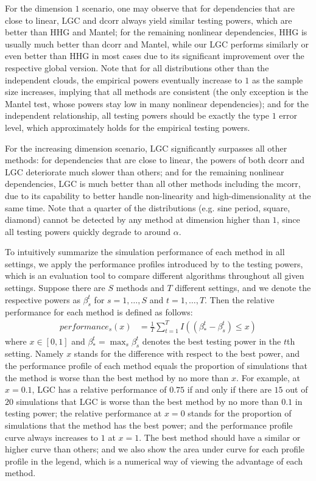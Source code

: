 \documentclass[11pt]{article}
\begin{document}
For the dimension $1$ scenario, one may observe that for dependencies that are close to linear, LGC and dcorr always yield similar testing powers, which are better than HHG and Mantel; for the remaining nonlinear dependencies, HHG is usually much better than dcorr and Mantel, while our LGC performs similarly or even better than HHG in most cases due to its significant improvement over the respective global version. Note that for all distributions other than the independent clouds, the empirical powers eventually increase to $1$ as the sample size increases, implying that all methods are consistent (the only exception is the Mantel test, whose powers stay low in many nonlinear dependencies); and for the independent relationship, all testing powers should be exactly the type $1$ error level, which approximately holds for the empirical testing powers. 

For the increasing dimension scenario, LGC significantly surpasses all other methods: for dependencies that are close to linear, the powers of both dcorr and LGC deteriorate much slower than others; and for the remaining nonlinear dependencies, LGC is much better than all other methods including the mcorr, due to its capability to better handle non-linearity and high-dimensionality at the same time. Note that a quarter of the distributions (e.g. sine period, square, diamond) cannot be detected by any method at dimension higher than $1$, since all testing powers quickly degrade to around $\alpha$.

To intuitively summarize the simulation performance of each method in all settings, we apply the performance profiles introduced by \cite{DolanMore2002} to the testing powers, which is an evaluation tool to compare different algorithms throughout all given settings. Suppose there are $S$ methods and $T$ different settings, and we denote the respective powers as $\beta_{s}^{t}$ for $s=1,\ldots,S$ and $t=1,\ldots,T$. Then the relative performance for each method is defined as follows:
\begin{align*}
performance_{s}(x) &= \frac{1}{T} \sum_{t=1}^{T} I((\beta_{*}^{t}-\beta_{s}^{t}) \leq x)
\end{align*}
where $x \in [0,1]$ and $\beta_{*}^{t} =\max_{s} \beta_{s}^{t}$ denotes the best testing power in the $t$th setting. Namely $x$ stands for the difference with respect to the best power, and the performance profile of each method equals the proportion of simulations that the method is worse than the best method by no more than $x$. For example, at $x=0.1$, LGC has a relative performance of $0.75$ if and only if there are $15$ out of $20$ simulations that LGC is worse than the best method by no more than $0.1$ in testing power; the relative performance at $x=0$ stands for the proportion of simulations that the method has the best power; and the performance profile curve always increases to $1$ at $x=1$. The best method should have a similar or higher curve than others; and we also show the area under curve for each profile profile in the legend, which is a numerical way of viewing the advantage of each method.
\end{document}
